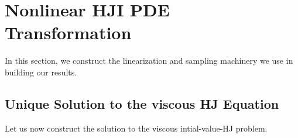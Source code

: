 \section{Nonlinear HJI PDE Transformation}
\label{app:proof_sol_hj_ivp}

\setcounter{appidx}{2}
\setcounter{equation}{0}

In this section, we construct the linearization and sampling machinery we use in building our results.

\subsection{Unique Solution to the viscous HJ Equation}
Let us now construct the solution to the viscous intial-value-HJ problem.
%

